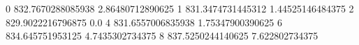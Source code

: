 0 832.7670288085938 2.86480712890625
1 831.3474731445312 1.44525146484375
2 829.9022216796875 0.0
4 831.6557006835938 1.75347900390625
6 834.645751953125 4.7435302734375
8 837.5250244140625 7.622802734375
